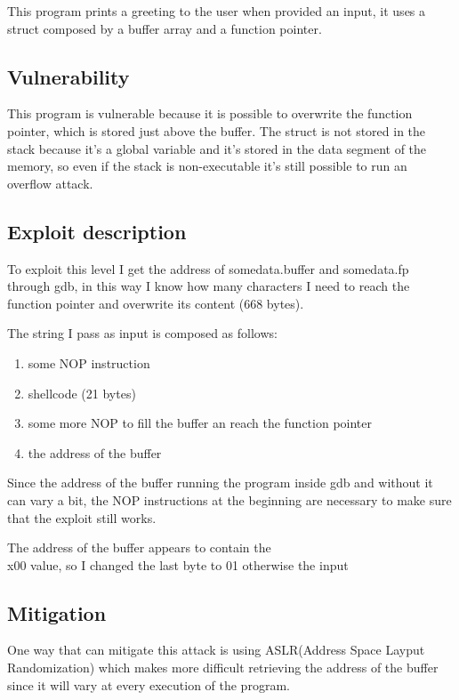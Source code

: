 \documentclass[a4paper,12pt]{article}
\begin{document}
This program prints a greeting to the user when provided an input, it uses a struct composed by a buffer array and a function pointer.

\subsection{Vulnerability}

This program is vulnerable because it is possible to overwrite the function pointer, which is stored just above the buffer.  The struct is not stored in the stack because it's a global variable and it's stored in the data segment of the memory, so even if the stack is non-executable it's still possible to run an overflow attack.


\subsection{Exploit description}

To exploit this level I get the address of somedata.buffer and somedata.fp through gdb, in this way I know how many characters I need to reach the function pointer and overwrite its content (668 bytes).

The string I pass as input is composed as follows:
\begin{enumerate}
\item some NOP instruction
\item shellcode (21 bytes)
\item some more NOP to fill the buffer an reach the function pointer
\item the address of the buffer
\end{enumerate}

Since the address of the buffer running the program inside gdb and without it can vary a bit, the NOP instructions at the beginning are necessary to make sure that the exploit still works.

The address of the buffer appears to contain the \\x00 value, so I changed the last byte to 01 otherwise the input  

\subsection{Mitigation}

One way that can mitigate this attack is using ASLR(Address Space Layput Randomization)
which makes more difficult retrieving the address of the buffer since it will vary at every execution of the program.
\end{document}
